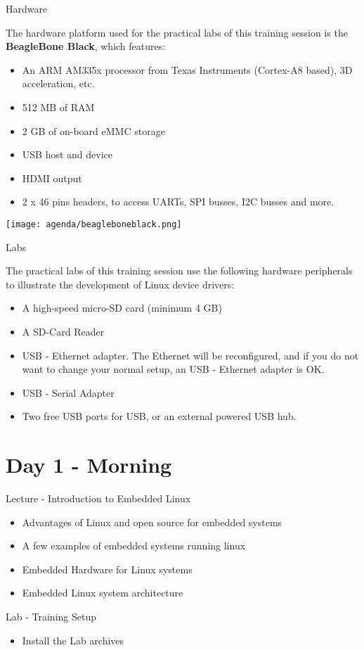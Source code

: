 \documentclass[a4paper,12pt,obeyspaces,spaces,hyphens]{article}
\begin{document}
\normalsize
\clearpage

\feagendatwocolumn
{Hardware}
{
  The hardware platform used for the practical labs of this training
  session is the {\bf BeagleBone Black}, which features:

  \begin{itemize}
  \item An ARM AM335x processor from Texas Instruments (Cortex-A8
    based), 3D acceleration, etc.
  \item 512 MB of RAM
  \item 2 GB of on-board eMMC storage
  \item USB host and device
  \item HDMI output
  \item 2 x 46 pins headers, to access UARTs, SPI busses, I2C busses
    and more.
  \end{itemize}
}
{}
{
  \begin{center}
    \texttt{[image: agenda/beagleboneblack.png]}
  \end{center}
}

\feagendaonecolumn
{Labs}
{
  The practical labs of this training session use the following
  hardware peripherals to illustrate the development of Linux device
  drivers:

  \begin{itemize}
  \item A high-speed micro-SD card (minimum 4 GB)
  \item A SD-Card Reader
  \item USB - Ethernet adapter.
      The Ethernet will be reconfigured, and if you do not 
      want to change your normal setup, an USB - Ethernet adapter is OK.
  \item USB - Serial Adapter
  \item Two free USB ports for USB, or an external powered USB hub.
  \end{itemize}
}

\clearpage
\section{Day 1 - Morning}

\feagendatwocolumn
{Lecture - Introduction to Embedded Linux}
{
  \begin{itemize}
  \item Advantages of Linux and open source for embedded systems
  \item A few examples of embedded systems running linux
  \item Embedded Hardware for Linux systems
  \item Embedded Linux system architecture
  \end{itemize}
}
{Lab - Training Setup}
{
  \begin{itemize}
  \item Install the Lab archives
 \end{itemize}
}
\end{document}
